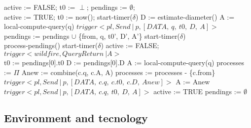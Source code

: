 \documentclass{article}
\begin{document}
\begin{algorithmic}[0]
    \State active := FALSE;
    \State t0 := $\perp$;
    \State pendings := $\emptyset$;
  \EndEvent
  \\
   
  	\State active := TRUE;
  	\State t0 := now();
  	\State start-timer($\delta$)
  	\State D := estimate-diameter()
  	\State A := local-compute-query(q)
      \State $trigger < pl, Send \ | \ p, [DATA, \ q, \ t0, \ D, \ A] >$
    \EndFor
  \EndEvent
  \\
    \State pendings := pendings $\cup$ \{from, q, t0', D', A'\}
    	\State start-timer($\delta$)
    \EndIf 
  \EndIf
  \EndEvent
  \\
  	\State process-pendings()
  	\State start-timer($\delta$)
  	\Else
  	\State active := FALSE;
  	\State $trigger < wildfire, QueryReturn \ | A >$
  	\EndIf
  \EndEvent
  \\
         
    		\State t0 := pendings[0].t0
    		\State D := pendings[0].D
    		\State A := local-compute-query(q)
    	\EndIf
    	\State processes := $\Pi$
      		\State Anew := combine(c.q, c.A, A) 
      		\State processes := processes - \{c.from\}
    	\EndFor
    			\State $trigger < pl, Send \ | \ p, [DATA, \ c.q, \ c.t0, \ c.D, \ Anew] >$
    		\EndIf
    	\EndFor
			\State A := Anew
    			\State $trigger < pl, Send \ | \ p, [DATA, \ c.q, \ t0, \ D, \ A] >$	
    		\EndFor
    		\State active := TRUE
		\EndIf
    	\State pendings := $\emptyset$
    \EndIf
  \EndProcedure
\end{algorithmic}

\subsection{Environment and tecnology}
\end{document}
